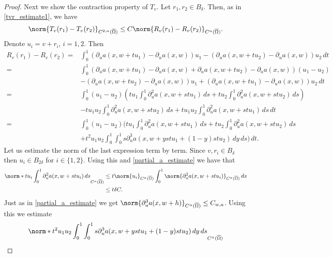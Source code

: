 \documentclass[11pt,a4paper]{amsart}
\theoremstyle{definition}
\numberwithin{equation}{section}
\newcommand{\ol}[1]{\overline{#1}}
\newcommand{\Om}{\Omega}
\begin{document}
\begin{proof}
Next we show the contraction property of $T_v.$ Let $r_1,r_2\in B_{\delta}$.
Then, as in \eqref{tvr_estimate1}, we have
\begin{equation*}
	\norm{T_v(r_1) - T_v(r_2)}_{C^{2,\alpha}(\ol{\Om})} \leq C\norm{R_v(r_1) - R_v(r_2)}_{C^{\alpha}(\ol{\Om})}.
\end{equation*}
Denote $u_i=v+r_i$, $i=1,2$.
Then
\begin{align*}
	R_v(r_1)-R_v(r_2) = &\int_0^1\left(\partial_u a(x , w + t u_1) - \partial_u a(x, w)\right) u_1 - \left(\partial_u a(x, w + t u_2)-\partial_u a(x,w)\right) u_2\,dt\\
	= &\int_0^1(\partial_u a(x,w+t u_1)-\partial_u a(x,w)+\partial_u a(x,w+t u_2)-\partial_u a(x,w)) (u_1-u_2) \\
	&-(\partial_u a(x,w+t u_2)-\partial_u a(x,w))u_1+(\partial_u a(x,w+t u_1)-\partial_u a(x,w))u_2\,dt\\
	= &\int_0^1(u_1-u_2)\left(t u_1\int_0^1\partial_u^2a(x,w+st u_1)\,ds+t u_2\int_0^1\partial_u^2a(x,w+st u_2)\,ds\right)\\
	&-t u_1u_2\int_0^1\partial_u^2a(x,w+st u_2)\,ds+t u_1u_2\int_0^1\partial_u^2a(x,w+st u_1)\,ds\,dt\\
	= &\int_0^1(u_1-u_2)\Bigg(t u_1\int_0^1\partial_u^2a(x,w+st u_1)\,ds+t u_2\int_0^1\partial_u^2a(x,w+st u_2)\,ds\\
	&+t^2u_1u_2\int_0^1\int_0^1 s \partial_u^3a(x,w + y s t u_1+(1-y)st u_2)\,dy\,ds\Bigg)\,dt.
\end{align*}
Let us estimate the norm of the last expression term by term.
Since $v,r_i\in B_{\delta}$ then $u_i\in B_{2\delta}$ for $i\in\{1,2\}$.
Using this and \eqref{partial_a_estimate} we have that
\begin{equation*}
\begin{aligned}
	\norm*{t u_i\int_0^1\partial_u^2a(x,w+st u_i)\,ds}_{C^{\alpha}(\ol{\Om})} &\leq t\norm{u_i}_{C^{\alpha}(\ol{\Om})}\int_0^1\norm{\partial_u^2a(x,w+st u_i)}_{C^{\alpha}(\ol{\Om})}\,ds \\
	&\leq t\delta C.
\end{aligned}
\end{equation*}
Just as in \eqref{partial_a_estimate} we get \( \norm{\partial_{u}^{3}a(x,w+h)}_{C^{\alpha}(\ol{\Omega})} \leq C_{w,a} \). Using this we estimate
\begin{equation*}
\begin{aligned}
	&\norm*{t^2u_1u_2\int_0^1\int_0^1 s \partial_u^3a(x,w + y s t u_1+(1-y)st u_2)\,dy\,ds}_{C^{\alpha}(\ol{\Om})} \\

\end{aligned}
\end{equation*}
\end{proof}
\end{document}
